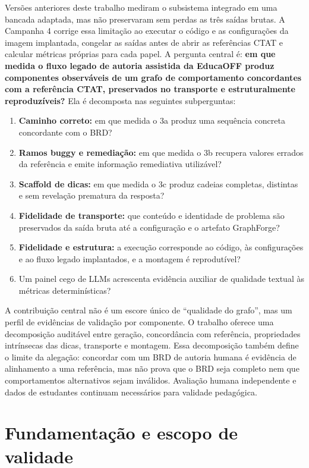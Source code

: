 \documentclass[11pt,a4paper]{article}
\begin{document}
Versões anteriores deste trabalho mediram o subsistema integrado em uma bancada adaptada, mas não preservaram sem perdas as três saídas brutas. A Campanha 4 corrige essa limitação ao executar o código e as configurações da imagem implantada, congelar as saídas antes de abrir as referências CTAT e calcular métricas próprias para cada papel. A pergunta central é: \textbf{em que medida o fluxo legado de autoria assistida da EducaOFF produz componentes observáveis de um grafo de comportamento concordantes com a referência CTAT, preservados no transporte e estruturalmente reproduzíveis?} Ela é decomposta nas seguintes subperguntas:

\begin{enumerate}[label=\textbf{QP\arabic*.}]
  \item \textbf{Caminho correto:} em que medida o 3a produz uma sequência concreta concordante com o BRD?
  \item \textbf{Ramos buggy e remediação:} em que medida o 3b recupera valores errados da referência e emite informação remediativa utilizável?
  \item \textbf{Scaffold de dicas:} em que medida o 3c produz cadeias completas, distintas e sem revelação prematura da resposta?
  \item \textbf{Fidelidade de transporte:} que conteúdo e identidade de problema são preservados da saída bruta até a configuração e o artefato GraphForge?
  \item \textbf{Fidelidade e estrutura:} a execução corresponde ao código, às configurações e ao fluxo legado implantados, e a montagem é reprodutível?
  \item Um painel cego de LLMs acrescenta evidência auxiliar de qualidade textual às métricas determinísticas?
\end{enumerate}

A contribuição central não é um escore único de ``qualidade do grafo'', mas um perfil de evidências de validação por componente. O trabalho oferece uma decomposição auditável entre geração, concordância com referência, propriedades intrínsecas das dicas, transporte e montagem. Essa decomposição também define o limite da alegação: concordar com um BRD de autoria humana é evidência de alinhamento a uma referência, mas não prova que o BRD seja completo nem que comportamentos alternativos sejam inválidos. Avaliação humana independente e dados de estudantes continuam necessários para validade pedagógica.

\section{Fundamentação e escopo de validade}
\end{document}
